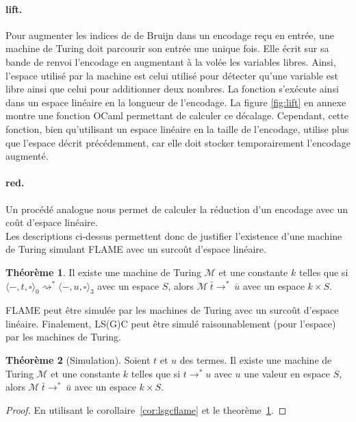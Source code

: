 \documentclass[a4paper, 11pt]{article}
\theoremstyle{definition}
\newtheorem{theorem}{Théorème}[section]
\newcommand{\etatz}[1]{\langle #1 \rangle_0}
\newcommand{\etatt}[1]{\langle #1 \rangle_3}
\newcommand{\ra}{\rightarrow}
\newcommand{\rsa}{\rightsquigarrow}
\begin{document}
\paragraph{lift.}
Pour augmenter les indices de de Bruijn dans un encodage reçu en entrée, une machine de Turing doit parcourir son entrée une unique fois.
Elle écrit sur sa bande de renvoi l'encodage en augmentant à la volée les variables libres. 
Ainsi, l'espace utilisé par la machine est celui utilisé pour détecter qu'une variable est libre ainsi que celui pour additionner deux nombres.
La fonction s'exécute ainsi dans un espace linéaire en la longueur de l'encodage.
La figure \ref{fig:lift} en annexe montre une fonction OCaml permettant de calculer ce décalage.
Cependant, cette fonction, bien qu'utilisant un espace linéaire en la taille de l'encodage, utilise plus que l'espace décrit précédemment, car elle doit stocker temporairement l'encodage augmenté.

\paragraph{red.}
Un procédé analogue nous permet de calculer la réduction d'un encodage avec un coût d'espace linéaire.\\

Les descriptions ci-dessus permettent donc de justifier l'existence d'une machine de Turing simulant FLAME avec un surcoût d'espace linéaire.
\begin{theorem}
  \label{thm:flametm}
  Il existe une machine de Turing $\mathcal{M}$ et une constante $k$ telles que si $\etatz{-, t, \square} \rsa^* \etatt{-, u, \square}$ avec un espace $S$, alors
  $\mathcal{M}~\bar{t} \ra^*~\bar{u}$ avec un espace $k\times S$. 
\end{theorem}

FLAME peut être simulée par les machines de Turing avec un surcoût d'espace linéaire.
Finalement, LS(G)C peut être simulé raisonnablement (pour l'espace) par les machines de Turing.  

\begin{theorem}[Simulation]
  Soient $t$ et $u$ des termes. Il existe une machine de Turing $\mathcal{M}$ et une constante $k$ telles que si $t \ra^* u$ avec $u$ une valeur en espace $S$, alors
  $\mathcal{M}~\bar{t} \ra^*~\bar{u}$ avec un espace $k\times S$. 
\end{theorem}
\begin{proof}
  En utilisant le corollaire~\ref{cor:lsgcflame} et le theorème~\ref{thm:flametm}.
\end{proof}
\end{document}
